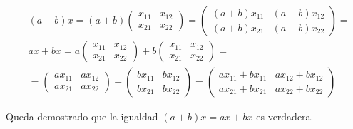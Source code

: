 \begin{exercise}[ Sea $a,b\in \R$, $x=\begin{pmatrix}
				x_{11}&x_{12}\\x_{21}&x_{22}\end{pmatrix}$, $x\in M_{2\times 2}(\R)$]

	\begin{align*}
		 & (a+b)x=(a+b)\begin{pmatrix}
			               x_{11}&x_{12}\\x_{21}&x_{22}\end{pmatrix}=\begin{pmatrix}
			                                                         (a+b)x_{11}&(a+b)x_{12}\\(a+b)x_{21}&(a+b)x_{22}\end{pmatrix}=                                                       \\
		 & ax+bx=a\begin{pmatrix}
			          x_{11}&x_{12}\\x_{21}&x_{22}\end{pmatrix}+b\begin{pmatrix}
			                                                     x_{11}&x_{12}\\x_{21}&x_{22}\end{pmatrix}=                                                                               \\
		 & =\begin{pmatrix}
			    ax_{11}&ax_{12}\\ax_{21}&ax_{22}\end{pmatrix}+\begin{pmatrix}
			                                                  bx_{11}&bx_{12}\\bx_{21}&bx_{22}\end{pmatrix}=\begin{pmatrix}
			                                                                                                ax_{11}+bx_{11}&ax_{12}+bx_{12}\\ax_{21}+bx_{21}&ax_{22}+bx_{22}\end{pmatrix}
	\end{align*}

	Queda demostrado que la igualdad $(a+b)x=ax+bx$ es verdadera.
\end{exercise}

